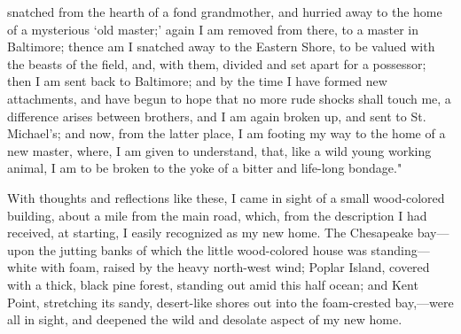 snatched from the hearth of a fond grandmother, and hurried away to the
home of a mysterious `old master;' again I am removed from there, to a
master in Baltimore; thence am I snatched away to the Eastern Shore, to
be valued with the beasts of the field, and, with them, divided and set
apart for a possessor; then I am sent back to Baltimore; and by the time
I have formed new attachments, and have begun to hope that no more rude
shocks shall touch me, a difference arises between brothers, and I am
again broken up, and sent to St. Michael's; and now, from the latter
place, I am footing my way to the home of a new master, where, I am
given to understand, that, {}like a wild young working animal, I am to
be broken to the yoke of a bitter and life-long bondage."

With thoughts and reflections like these, I came in sight of a small
wood-colored building, about a mile from the main road, which, from the
description I had received, at starting, I easily recognized as my new
home. The Chesapeake bay---upon the jutting banks of which the little
wood-colored house was standing---white with foam, raised by the heavy
north-west wind; Poplar Island, covered with a thick, black pine forest,
standing out amid this half ocean; and Kent Point, stretching its sandy,
desert-like shores out into the foam-crested bay,---were all in sight,
and deepened the wild and desolate aspect of my new home.

